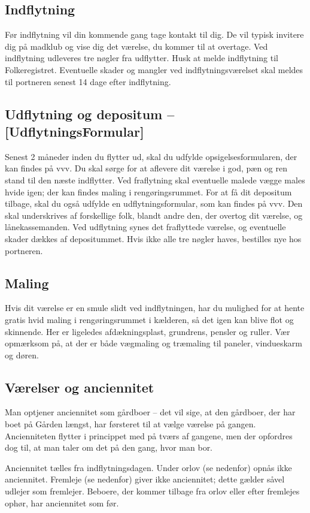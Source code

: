 \documentclass[11pt,article,twoside,openany,danish,extrafontsizes]{memoir} %
\begin{document}
\subsection{Indflytning}
Før indflytning vil din kommende gang tage kontakt til dig. De vil typisk invitere dig på madklub og vise dig det værelse, du kommer til at overtage. Ved indflytning udleveres tre nøgler fra udflytter. Husk at melde indflytning til Folkeregistret. Eventuelle skader og mangler ved indflytningsværelset skal meldes til portneren senest 14 dage efter indflytning.

\subsection{Udflytning og depositum -- [UdflytningsFormular]}
Senest 2 måneder inden du flytter ud, skal du udfylde opsigelsesformularen, der kan findes på vvv. Du skal sørge for at aflevere dit værelse i god, pæn og ren stand til den næste indflytter. Ved fraflytning skal eventuelle malede vægge males hvide igen; der kan findes maling i rengøringsrummet. For at få dit depositum tilbage, skal du også udfylde en udflytningsformular, som kan findes på vvv. Den skal underskrives af forskellige folk, blandt andre den, der overtog dit værelse, og lånekassemanden. Ved udflytning synes det fraflyttede værelse, og eventuelle skader dækkes af depositummet. Hvis ikke alle tre nøgler haves, bestilles nye hos portneren.


\subsection{Maling}
Hvis dit værelse er en smule slidt ved indflytningen, har du mulighed for at hente gratis hvid maling i rengøringsrummet i kælderen, så det igen kan blive flot og skinnende. Her er ligeledes afdækningsplast, grundrens, pensler og ruller. Vær opmærksom på, at der er både vægmaling og træmaling til paneler, vindueskarm og døren.

\subsection{Værelser og anciennitet}
Man optjener anciennitet som gårdboer -- det vil sige, at den gårdboer, der har boet på Gården længst, har førsteret til at vælge værelse på gangen. Ancienniteten flytter i princippet med på tværs af gangene, men der opfordres dog til, at man taler om det på den gang, hvor man bor.

Anciennitet tælles fra indflytningsdagen. Under orlov (se nedenfor) opnås ikke anciennitet. Fremleje (se nedenfor) giver ikke anciennitet; dette gælder såvel udlejer som fremlejer. Beboere, der kommer tilbage fra orlov eller efter fremlejes ophør, har anciennitet som før.
\end{document}
